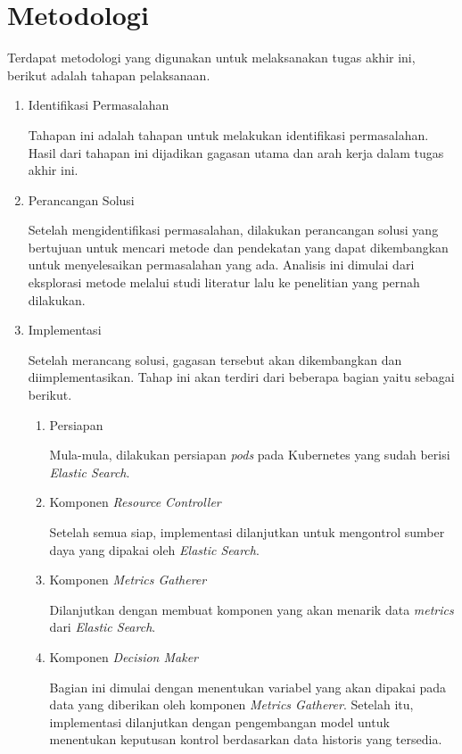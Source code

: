 \section{Metodologi}

Terdapat metodologi yang digunakan untuk melaksanakan tugas akhir ini, berikut adalah tahapan pelaksanaan.
\begin{enumerate}
    \item Identifikasi Permasalahan
    
    Tahapan ini adalah tahapan untuk melakukan identifikasi permasalahan. Hasil dari tahapan ini dijadikan gagasan utama dan arah kerja dalam tugas akhir ini.

    \item Perancangan Solusi
    
    Setelah mengidentifikasi permasalahan, dilakukan perancangan solusi yang bertujuan untuk mencari metode dan pendekatan yang dapat dikembangkan untuk menyelesaikan permasalahan yang ada. Analisis ini dimulai dari eksplorasi metode melalui studi literatur lalu ke penelitian yang pernah dilakukan.

    \item Implementasi
    
    Setelah merancang solusi, gagasan tersebut akan dikembangkan dan diimplementasikan. Tahap ini akan terdiri dari beberapa bagian yaitu sebagai berikut.
    \begin{enumerate}
        \item Persiapan
    
        Mula-mula, dilakukan persiapan \textit{pods} pada Kubernetes yang sudah berisi \textit{Elastic Search}.

        \item Komponen \textit{Resource Controller}
        
        Setelah semua siap, implementasi dilanjutkan untuk mengontrol sumber daya yang dipakai oleh \textit{Elastic Search}.

        \item Komponen \textit{Metrics Gatherer}
        
        Dilanjutkan dengan membuat komponen yang akan menarik data \textit{metrics} dari \textit{Elastic Search}.

        \item Komponen \textit{Decision Maker}
        
        Bagian ini dimulai dengan menentukan variabel yang akan dipakai pada data yang diberikan oleh komponen \textit{Metrics Gatherer}. Setelah itu, implementasi dilanjutkan dengan pengembangan model untuk menentukan keputusan kontrol berdasarkan data historis yang tersedia.


\end{enumerate}
\end{enumerate}
